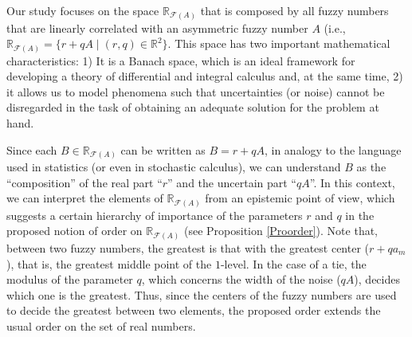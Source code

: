 \documentclass[12pt,a4paper]{article}
\newcommand{\RR}{\mathbb{R}}
\newcommand{\RFA}{\mathbb{R}_{\mathcal{F}(A)}}
\begin{document}
Our study focuses on the space $\RFA$ that is composed by all fuzzy numbers that are linearly correlated with an asymmetric fuzzy number $A$ (i.e., $\RFA = \{r+qA\mid (r,q) \in \RR^2 \}$. This space has two important mathematical characteristics: 1) It is a Banach space, which is an ideal framework for developing a theory of differential and integral calculus and, at the same time, 2) it allows us to model phenomena such that uncertainties (or noise) cannot be disregarded in the task of obtaining an adequate solution for the problem at hand.   

Since each $B \in \RFA$ can be written as $B = r+qA$, in analogy to the language used in statistics (or even in stochastic calculus), we can understand $B$ as the ``composition'' of the real part ``$r$'' and the uncertain part ``$qA$''. In this context, we can interpret the elements of $\RFA$ from an epistemic point of view, which suggests a certain hierarchy of importance of the parameters $r$ and $q$ in the proposed notion of order on $\RFA$ (see Proposition \ref{Proorder}). 
Note that, between two fuzzy numbers, the greatest is that with the greatest center ($r+qa_m$), that is, the greatest middle point of the $1$-level. In the case of a tie, the modulus of the parameter $q$, which concerns the width of the noise ($qA$), decides which one is the greatest. 
Thus, since the centers of the fuzzy numbers are used to decide the greatest between two elements,  
the proposed order extends the usual order on the set of real numbers.  
\end{document}
